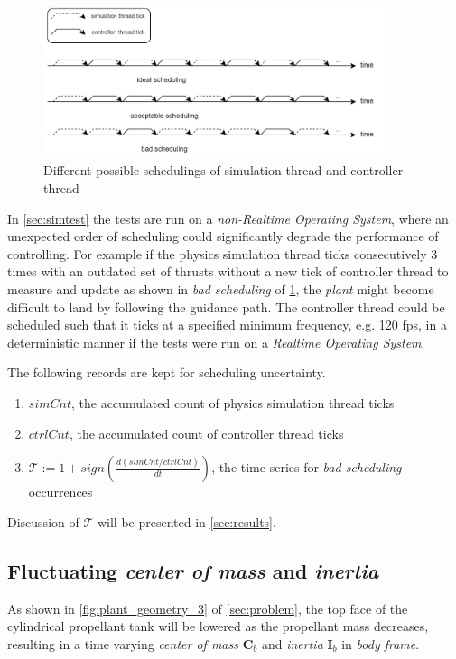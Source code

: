 \documentclass[10pt]{elsarticle}
\begin{document}
\begin{figure}[!ht]
    \centering
    \includegraphics[width=10.0cm, keepaspectratio]{Schedulings}
    \vspace*{3mm}
    \caption{Different possible schedulings of simulation thread and controller thread}
    \label{fig:schedulings}
\end{figure}
In \cref{sec:simtest} the tests are run on a \textit{non-Realtime Operating System}, where an unexpected order of scheduling could significantly degrade the performance of controlling. For example if the physics simulation thread ticks consecutively 3 times with an outdated set of thrusts without a new tick of controller thread to measure and update as shown in \textit{bad scheduling} of \cref{fig:schedulings}, the \textit{plant} might become difficult to land by following the guidance path. The controller thread could be scheduled such that it ticks at a specified minimum frequency, e.g. 120 fps, in a deterministic manner if the tests were run on a \textit{Realtime Operating System}.  

The following records are kept for scheduling uncertainty.
\begin{enumerate}[label=\textbf{e.\arabic*}, itemsep=2pt] %
  \item \label{eqs:simCnt} $simCnt$, the accumulated count of physics simulation thread ticks  
  \item \label{eqs:ctrlCnt} $ctrlCnt$, the accumulated count of controller thread ticks
  \item \label{eqs:tickRatio} $\mathcal{T} := 1+sign(\frac{d(simCnt/ctrlCnt)}{dt})$, the time series for \textit{bad scheduling} occurrences    
\end{enumerate}

Discussion of $\mathcal{T}$ will be presented in \cref{sec:results}.

\subsection{Fluctuating \textit{center of mass} and \textit{inertia}}
As shown in \cref{fig:plant_geometry_3} of \cref{sec:problem}, the top face of the cylindrical propellant tank will be lowered as the propellant mass decreases, resulting in a time varying \textit{center of mass} $\boldsymbol{C}_b$ and \textit{inertia} $\boldsymbol{I}_b$ in \textit{body frame}. 
\end{document}
